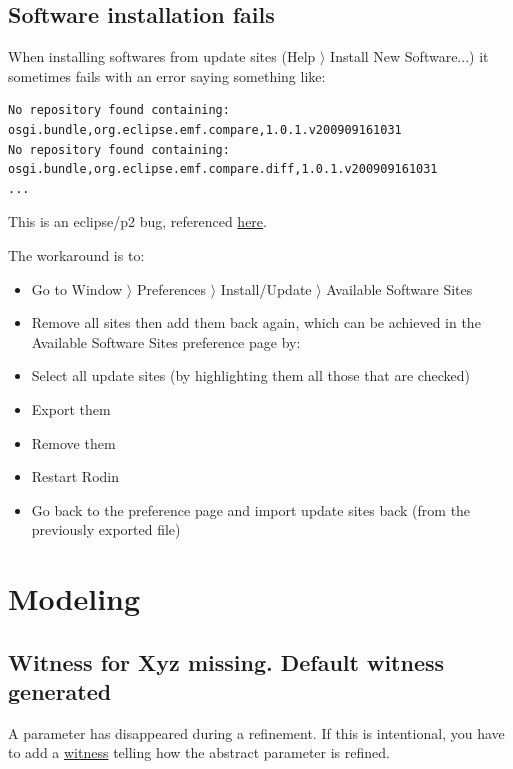 \subsection{Software installation fails}

When installing softwares from update sites (\textsf{Help $\rangle$ Install New Software...}) it sometimes fails with an error saying something like: 

\begin{verbatim}
No repository found containing: osgi.bundle,org.eclipse.emf.compare,1.0.1.v200909161031
No repository found containing: osgi.bundle,org.eclipse.emf.compare.diff,1.0.1.v200909161031
...
\end{verbatim}

This is an eclipse/p2 bug, referenced \href{http://stackoverflow.com/questions/511367/error-when-updating-eclipse}{here}. 

The workaround is to: 

\begin{itemize}
	\item Go to \textsf{Window $\rangle$ Preferences $\rangle$ Install/Update $\rangle$ Available Software Sites} 
	\item Remove all sites then add them back again, which can be achieved in the \textsf{Available Software Sites} preference page by: 
	\item Select all update sites (by highlighting them all those that are checked) 
	\item Export them 
	\item Remove them
	\item Restart Rodin
	\item Go back to the preference page and import update sites back (from the previously exported file) 
\end{itemize}

\section{Modeling}

\subsection{Witness for \textsf{Xyz} missing. Default witness generated}

A parameter has disappeared during a refinement. If this is intentional, you have to add a \href{http://wiki.event-b.org/index.php/Witnesses_(Modelling_Language)}{witness} telling how the abstract parameter is refined. 

